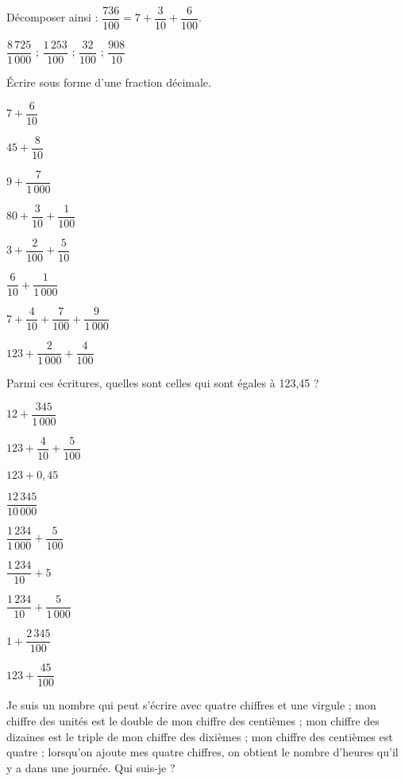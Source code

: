 \begin{colonne*exercice}
\begin{exercice}
   Décomposer ainsi : $\dfrac{736}{100} =7+\dfrac{3}{10}+\dfrac{6}{100}$.
   \begin{center}
      $\dfrac{8\,725}{1\,000}$ \; ; \; $\dfrac{1\,253}{100}$ \; ; \; $\dfrac{32}{100}$ \; ; \; $\dfrac{908}{10}$
   \end{center}
\end{exercice}

\begin{exercice}
   Écrire sous forme d'une fraction décimale. \smallskip
   \begin{colenumerate}{2}
      \item $7+\dfrac{6}{10}$ \smallskip
      \item $45+\dfrac{8}{10}$ \smallskip
      \item $9+\dfrac{7}{1\,000}$ \smallskip
      \item $80+\dfrac{3}{10}+\dfrac{1}{100}$ \smallskip
      \item $3+\dfrac{2}{100}+\dfrac{5}{10}$ \smallskip
      \item $\dfrac{6}{10}+\dfrac{1}{1\,000}$ \smallskip
      \item $7+\dfrac{4}{10}+\dfrac{7}{100}+\dfrac{9}{1\,000}$ \smallskip
      \item $123+\dfrac{2}{1\,000}+\dfrac{4}{100}$
   \end{colenumerate}
\end{exercice}

\begin{exercice}
   Parmi ces écritures, quelles sont celles qui sont égales à 123,45 ? \smallskip
   \begin{colenumerate}{3}
      \item $12+\dfrac{345}{1\,000}$ \smallskip
      \item \small$123+\dfrac{4}{10}+\dfrac{5}{100}$ \smallskip
      \item $123+0,45$ \smallskip
      \item $\dfrac{12\,345}{10\,000}$ \smallskip
      \item $\dfrac{1\,234}{1\,000}+\dfrac{5}{100}$ \smallskip 
      \item $\dfrac{1\,234}{10}+5$ \smallskip
      \item $\dfrac{1\,234}{10}+\dfrac{5}{1\,000}$ \smallskip
      \item $1+\dfrac{2\,345}{100}$ \smallskip
      \item $123+\dfrac{45}{100}$
   \end{colenumerate}
\end{exercice}

\begin{exercice}
   Je suis un nombre qui peut s'écrire avec quatre chiffres et une virgule ; mon chiffre des unités est le double de mon chiffre des centièmes ; mon chiffre des dizaines est le triple de mon chiffre des dixièmes ; mon chiffre des centièmes est quatre ; lorsqu'on ajoute mes quatre chiffres, on obtient le nombre d'heures qu'il y a dans une journée. Qui suis-je ?
\end{exercice}

\end{colonne*exercice}

